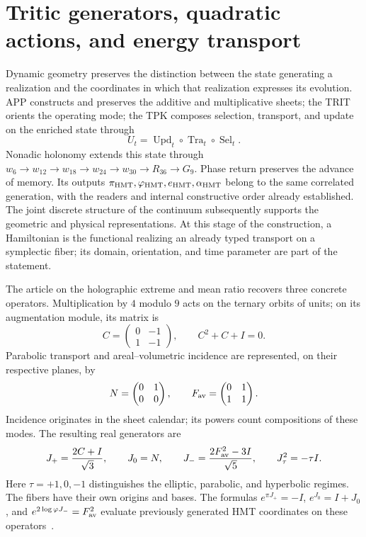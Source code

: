 \section{Tritic generators, quadratic actions, and energy transport}
\label{sec:hamiltonianos-curvatura}

Dynamic geometry preserves the distinction between the state generating a
realization and the coordinates in which that realization expresses its evolution. APP
constructs and preserves the additive and multiplicative sheets; the TRIT orients the
operating mode; the TPK composes selection, transport, and update on
the enriched state through
\[
 U_t=\operatorname{Upd}_t\circ\operatorname{Tra}_t\circ
 \operatorname{Sel}_t.
\]
Nonadic holonomy extends this state through
\(w_6\to w_{12}\to w_{18}\to w_{24}\to w_{30}\to R_{36}\to G_9\).
Phase return preserves the advance of memory. Its outputs
\(\pi_{\rm HMT},\varphi_{\rm HMT},e_{\rm HMT},\alpha_{\rm HMT}\)
belong to the same correlated generation, with the readers and internal
constructive order already established. The joint discrete structure
of the continuum subsequently supports the geometric and physical representations.
At this stage of the construction, a Hamiltonian is the functional
realizing an already typed transport on a symplectic fiber; its domain,
orientation, and time parameter are part of the statement.

The article on the holographic extreme and mean ratio recovers three
concrete operators. Multiplication by \(4\) modulo \(9\) acts on
the ternary orbits of units; on its augmentation module, its matrix is
\[
 C=\begin{pmatrix}0&-1\\1&-1\end{pmatrix},\qquad C^2+C+I=0.
\]
Parabolic transport and areal--volumetric incidence are
represented, on their respective planes, by
\[
 N=\begin{pmatrix}0&1\\0&0\end{pmatrix},\qquad
 F_{\rm av}=\begin{pmatrix}0&1\\1&1\end{pmatrix}.
\]
Incidence originates in the sheet calendar; its powers count
compositions of these modes. The resulting real generators are
\begin{equation}
 J_+=\frac{2C+I}{\sqrt3},\qquad J_0=N,\qquad
 J_-=\frac{2F_{\rm av}^{2}-3I}{\sqrt5},\qquad
 J_\tau^2=-\tau I.
 \label{eq:hc-generadores}
\end{equation}
Here \(\tau=+1,0,-1\) distinguishes the elliptic, parabolic, and
hyperbolic regimes. The fibers have their own origins and bases. The formulas
\(e^{\pi J_+}=-I\), \(e^{J_0}=I+J_0\), and
\(e^{2\log\varphi J_-}=F_{\rm av}^{2}\) evaluate previously generated HMT
coordinates on these operators~\cite{hmtX}.

